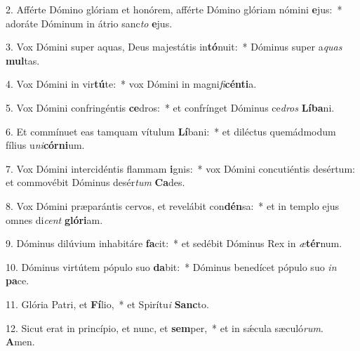 2. Afférte Dómino glóriam et honórem, afférte Dómino glóriam nómini \textbf{e}jus:~*  adoráte Dóminum in átrio sanc\textit{to} \textbf{e}jus.\

3. Vox Dómini super aquas, Deus majestátis in\textbf{tó}nuit:~*  Dóminus super a\textit{quas} \textbf{mul}tas.\

4. Vox Dómini in vir\textbf{tú}te:~*  vox Dómini in magni\textit{fi}\textbf{cén}\textbf{ti}a.\

5. Vox Dómini confringéntis \textbf{ce}dros:~*  et confrínget Dóminus ce\textit{dros} \textbf{Lí}\textbf{ba}ni.\

6. Et commínuet eas tamquam vítulum \textbf{Lí}bani:~*  et diléctus quemádmodum fílius u\textit{ni}\textbf{cór}\textbf{ni}um.\

7. Vox Dómini intercidéntis flammam \textbf{i}gnis:~*  vox Dómini concutiéntis desértum: et commovébit Dóminus desér\textit{tum} \textbf{Ca}des.\

8. Vox Dómini præparántis cervos, et revelábit con\textbf{dén}sa:~*  et in templo ejus omnes di\textit{cent} \textbf{gló}\textbf{ri}am.\

9. Dóminus dilúvium inhabitáre \textbf{fa}cit:~*  et sedébit Dóminus Rex in \textit{æ}\textbf{tér}num.\

10. Dóminus virtútem pópulo suo \textbf{da}bit:~*  Dóminus benedícet pópulo suo \textit{in} \textbf{pa}ce.\

11. Glória Patri, et \textbf{Fí}lio,~*  et Spirítu\textit{i} \textbf{Sanc}to.\

12. Sicut erat in princípio, et nunc, et \textbf{sem}per,~*  et in sǽcula sæculó\textit{rum}. \textbf{A}men.\

